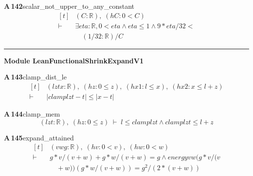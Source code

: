 \documentclass[conference]{IEEEtran}
\theoremstyle{definition}
\newcommand{\lean}[1]{\textsf{\footnotesize #1}}
\begin{document}
\noindent\textbf{A\,142}\quad\lean{scalar\_not\_upper\_to\_any\_constant}
{\footnotesize\[ \begin{aligned}[t]
&(\mathit{C} : \mathbb{R} ),\; (\mathit{hC} : 0 < \mathit{C})\\
\vdash\;&\exists \mathit{eta} : \mathbb{R} , 0 < \mathit{eta} \wedge \mathit{eta} \leq 1 \wedge 9 * \mathit{eta} / 32 <\\
&\quad (1 / 32 : \mathbb{R} ) / \mathit{C}
\end{aligned} \]}

\vspace{4pt}\noindent\rule{\columnwidth}{0.4pt}\par\vspace{2pt}
\noindent\textbf{Module \lean{LeanFunctionalShrinkExpandV1}}\par\vspace{3pt}

\noindent\textbf{A\,143}\quad\lean{clamp\_dist\_le}
{\footnotesize\[ \begin{aligned}[t]
&(\mathit{l} \mathit{z} \mathit{t} \mathit{x} : \mathbb{R} ),\; (\mathit{hz} : 0 \leq \mathit{z}),\; (\mathit{hx1} : \mathit{l} \leq \mathit{x}),\; (\mathit{hx2} : \mathit{x} \leq \mathit{l} + \mathit{z})\\
\vdash\;&|\mathit{clamp} \mathit{l} \mathit{z} \mathit{t} - \mathit{t}| \leq |\mathit{x} - \mathit{t}|
\end{aligned} \]}

\noindent\textbf{A\,144}\quad\lean{clamp\_mem}
{\footnotesize\[ (\mathit{l} \mathit{z} \mathit{t} : \mathbb{R} ),\; (\mathit{hz} : 0 \leq \mathit{z}) \;\vdash\; \mathit{l} \leq \mathit{clamp} \mathit{l} \mathit{z} \mathit{t} \wedge \mathit{clamp} \mathit{l} \mathit{z} \mathit{t} \leq \mathit{l} + \mathit{z} \]}

\noindent\textbf{A\,145}\quad\lean{expand\_attained}
{\footnotesize\[ \begin{aligned}[t]
&(\mathit{v} \mathit{w} \mathit{g} : \mathbb{R} ),\; (\mathit{hv} : 0 < \mathit{v}),\; (\mathit{hw} : 0 < \mathit{w})\\
\vdash\;&\mathit{g} * \mathit{v} / (\mathit{v} + \mathit{w}) + \mathit{g} * \mathit{w} / (\mathit{v} + \mathit{w}) = \mathit{g} \wedge \mathit{energy} \mathit{v} \mathit{w} (\mathit{g} * \mathit{v} / (\mathit{v}\\
&\quad + \mathit{w})) (\mathit{g} * \mathit{w} / (\mathit{v} + \mathit{w})) = \mathit{g} ^{2} / (2 * (\mathit{v} + \mathit{w}))
\end{aligned} \]}
\end{document}
